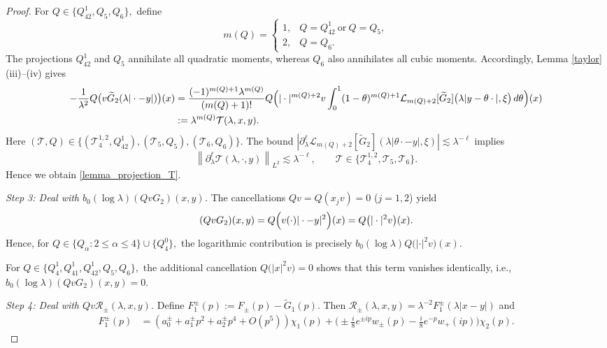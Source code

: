 \documentclass[reqno]{amsart}
\numberwithin{equation}{section}
\begin{document}
\begin{proof}
	
	
	
	
	For
	$
	Q\in\{Q_{42}^1,Q_5,Q_6\},
	$
	define
	$$
	m(Q)
	=
	\begin{cases}
		1,
		&
		Q=Q_{42}^1\ \text{or}\ Q=Q_5,
		\\
		2,
		&
		Q=Q_6.
	\end{cases}
	$$
	The projections $Q_{42}^1$ and $Q_5$ annihilate all quadratic
	moments, whereas $Q_6$ also annihilates all cubic moments.
	Accordingly, Lemma \ref{taylor}(iii)--(iv) gives
	\begin{align*}
	-\frac{1}{\lambda^2}Q\bigl(v	\widetilde{G}_2(\lambda|\cdot-y|)\bigr)(x)
		&=	\frac{(-1)^{m(Q)+1}\lambda^{m(Q)}}{(m(Q)+1)!}
		Q
		\Bigl(
		|\cdot|^{m(Q)+2}v
		\int_0^1
		(1-\theta)^{m(Q)+1}
		\mathcal{L}_{m(Q)+2}[\widetilde{G}_2]
		\bigl(
		\lambda|y-\theta\cdot|,
		\xi
		\bigr)
		\,d\theta
		\Bigr)(x)\\
		&:=\lambda^{m(Q)}\mathcal{T}(\lambda,x,y).
	\end{align*}
Here $(\mathcal{T},Q)\in\{(\mathcal{T}_4^{1,2}, Q_{42}^1), (\mathcal{T}_5, Q_5), (\mathcal{T}_6, Q_6)\}.$
	The bound $|\partial_\lambda^\ell \mathcal{L}_{m(Q)+2}[\widetilde{G}_2](\lambda| \theta \cdot-y|, \xi)| \lesssim  \lambda^{-\ell}$  implies
	$$
	\left\|
	\partial_\lambda^\ell
	\mathcal{T}(\lambda,\cdot,y)
	\right\|_{L^2}
	\lesssim
	\lambda^{-\ell},
	\qquad
	\mathcal{T}
	\in
	\{\mathcal{T}_4^{1,2},\mathcal{T}_5,\mathcal{T}_6\}.
	$$
	Hence we obtain
	\eqref{lemma_projection_T}.
	
	\medskip
	
	\textit{Step 3: Deal with $	b_0(\log\lambda)(QvG_2)(x,y)$.}
	The cancellations
	$
	Qv=Q(x_jv)=0
	$ ($ j=1,2$)
	yield
	\[
		(QvG_2)(x,y)
		=
		Q
		\Bigl(
		v(\cdot)|\cdot-y|^2
		\Bigr)(x)=
		Q
		\bigl(
		|\cdot|^2v
		\bigr)(x).
	\]
	Hence, for
	$
	Q
	\in
	\{Q_\alpha:2\leq\alpha\leq4\}
	\cup
	\{Q_4^0\},
	$
	the logarithmic contribution is precisely
	$
	b_0(\log\lambda)
	Q\bigl(|\cdot|^2v\bigr)(x).
	$
	
	For
	$
	Q
	\in
	\{Q_4^1,Q_{41}^1,Q_{42}^1,Q_5,Q_6\},
	$
	the additional cancellation
	$
	Q\bigl(|x|^2v\bigr)=0
	$
	shows that this term vanishes identically, i.e., $	b_0(\log\lambda)(QvG_2)(x,y)=0.$
	
	\medskip
	
	\textit{Step 4: Deal with $Qv	\mathcal{R}_\pm(\lambda,x,y)$.}
	Define
	$
	F_1^\pm(p)
	:=
	F_\pm(p)-\widetilde{G}_1(p).
	$
	Then
	$
	\mathcal{R}_\pm(\lambda,x,y)
	=
	\lambda^{-2}
	F_1^\pm(\lambda|x-y|)
	$ and
		\begin{align*}
		F_1^\pm(p) &= \left(a_0^\pm  + a_1^\pm p^2 + a_2^\pm p^4 + O(p^5)\right)\chi_1(p) + \Big(\pm \frac{i}{8} e^{\pm ip} w_\pm(p) - \frac{i}{8} e^{-p} w_+(ip)\Big)\chi_2(p).
	\end{align*}
	

\end{proof}
\end{document}
